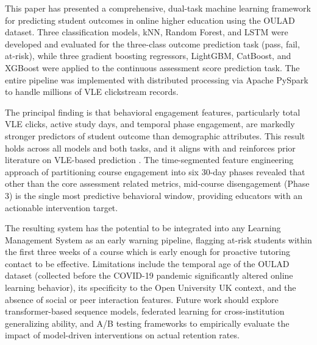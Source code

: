 \documentclass[conference]{IEEEtran}
\begin{document}
This paper has presented a comprehensive, dual-task machine learning framework for predicting student outcomes in online higher education using the OULAD dataset. Three classification models, kNN, Random Forest, and LSTM  were developed and evaluated for the three-class outcome prediction task (pass, fail, at-risk), while three gradient boosting regressors, LightGBM, CatBoost, and XGBoost were applied to the continuous assessment score prediction task. The entire pipeline was implemented with distributed processing via Apache PySpark to handle millions of VLE clickstream records.

The principal finding is that behavioral engagement features, particularly total VLE clicks, active study days, and temporal phase engagement, are markedly stronger predictors of student outcome than demographic attributes. This result holds across all models and both tasks, and it aligns with and reinforces prior literature on VLE-based prediction \cite{1, 3}. The time-segmented feature engineering approach of partitioning course engagement into six 30-day phases revealed that other than the core assessment related metrics, mid-course disengagement (Phase 3) is the single most predictive behavioral window, providing educators with an actionable intervention target.

The resulting system has the potential to be integrated into any Learning Management System as an early warning pipeline, flagging at-risk students within the first three weeks of a course which is early enough for proactive tutoring contact to be effective. Limitations include the temporal age of the OULAD dataset (collected before the COVID-19 pandemic significantly altered online learning behavior), its specificity to the Open University UK context, and the absence of social or peer interaction features. Future work should explore transformer-based sequence models, federated learning for cross-institution generalizing ability, and A/B testing frameworks to empirically evaluate the impact of model-driven interventions on actual retention rates.
\end{document}
